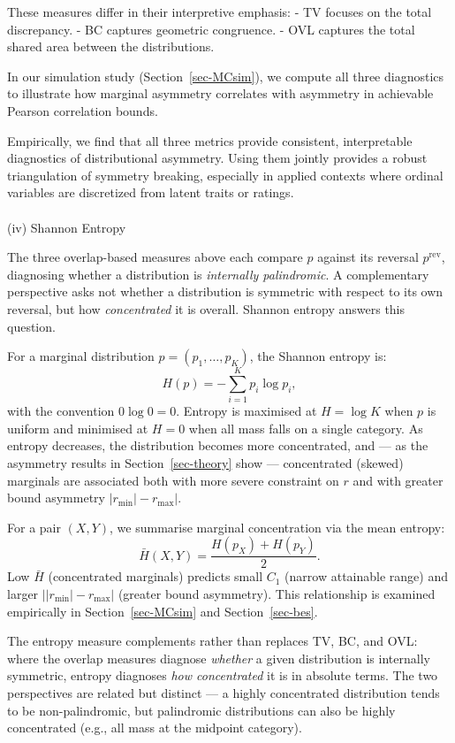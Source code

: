 \documentclass[
  12pt,
]{article}
\makeatletter
\let\oldparagraph\paragraph
\renewcommand{\paragraph}{
    \@ifstar
      \xxxParagraphStar
      \xxxParagraphNoStar
  }
\newcommand{\xxxParagraphStar}[1]{\oldparagraph*{#1}\mbox{}}
\newcommand{\xxxParagraphNoStar}[1]{\oldparagraph{#1}\mbox{}}
\theoremstyle{plain}
\theoremstyle{definition}
\theoremstyle{remark}
\makeatother
\begin{document}
These measures differ in their interpretive emphasis: - TV focuses on
the total discrepancy. - BC captures geometric congruence. - OVL
captures the total shared area between the distributions.

In our simulation study (Section~\ref{sec-MCsim}), we compute all three
diagnostics to illustrate how marginal asymmetry correlates with
asymmetry in achievable Pearson correlation bounds.

Empirically, we find that all three metrics provide consistent,
interpretable diagnostics of distributional asymmetry. Using them
jointly provides a robust triangulation of symmetry breaking, especially
in applied contexts where ordinal variables are discretized from latent
traits or ratings.

\paragraph{(iv) Shannon Entropy}\label{iv-shannon-entropy}

The three overlap-based measures above each compare \(p\) against its
reversal \(p^{\mathrm{rev}}\), diagnosing whether a distribution is
\emph{internally palindromic}. A complementary perspective asks not
whether a distribution is symmetric with respect to its own reversal,
but how \emph{concentrated} it is overall. Shannon entropy answers this
question.

For a marginal distribution \(p = (p_1, \ldots, p_K)\), the Shannon
entropy is: \[
H(p) = -\sum_{i=1}^{K} p_i \log p_i,
\] with the convention \(0 \log 0 = 0\). Entropy is maximised at
\(H = \log K\) when \(p\) is uniform and minimised at \(H = 0\) when all
mass falls on a single category. As entropy decreases, the distribution
becomes more concentrated, and --- as the asymmetry results in
Section~\ref{sec-theory} show --- concentrated (skewed) marginals are
associated both with more severe constraint on \(r\) and with greater
bound asymmetry \(|r_{\min}| - r_{\max}|\).

For a pair \((X, Y)\), we summarise marginal concentration via the mean
entropy: \[
\bar{H}(X,Y) = \frac{H(p_X) + H(p_Y)}{2}.
\] Low \(\bar{H}\) (concentrated marginals) predicts small \(C_1\)
(narrow attainable range) and larger
\(\bigl||r_{\min}| - r_{\max}\bigr|\) (greater bound asymmetry). This
relationship is examined empirically in Section~\ref{sec-MCsim} and
Section~\ref{sec-bes}.

The entropy measure complements rather than replaces TV, BC, and OVL:
where the overlap measures diagnose \emph{whether} a given distribution
is internally symmetric, entropy diagnoses \emph{how concentrated} it is
in absolute terms. The two perspectives are related but distinct --- a
highly concentrated distribution tends to be non-palindromic, but
palindromic distributions can also be highly concentrated (e.g., all
mass at the midpoint category).
\end{document}
